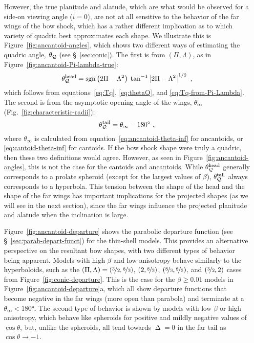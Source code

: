 \documentclass[useAMS, usenatbib, a4paper]{mnras}
\DeclareMathOperator{\sgn}{sgn}
\DeclareMathOperator{\Depart}{\Delta}
\providecommand{\Abs}[1]{\left\lvert#1\right\rvert}
\begin{document}
However, the true planitude and alatude, which are what would be
observed for a side-on viewing angle (\(i = 0\)), are not at all
sensitive to the behavior of the far wings of the bow shock, which has
a rather different implication as to which variety of quadric best
approximates each shape.  We illustrate this is
Figure~\ref{fig:ancantoid-angles}, which shows two different ways of
estimating the quadric angle, \(\theta_{\mathcal{Q}}\) (see \S~\ref{sec:conic}).
The first is from \((\Pi, \Lambda)\), as in
Figure~\ref{fig:ancantoid-Pi-lambda-true}:
\newcommand\head{^{\text{head}}}
\newcommand\tail{^{\text{tail}}}
\begin{equation}
  \label{eq:thetaQ-head}
  \theta_{\Q}\head =
  \sgn{\bigl(2 \Pi - \Lambda^2\bigr)} \;
  \tan^{-1} \Abs{2\Pi - \Lambda^2}^{1/2} \ ,
\end{equation}
which follows from equations~\eqref{eq:Tq}, \eqref{eq:thetaQ}, and
\eqref{eq:Tq-from-Pi-Lambda}.  The second is from the asymptotic
opening angle of the wings, \(\theta_\infty\) (Fig.~\ref{fig:characteristic-radii}):
\begin{equation}
  \label{eq:thetaQ-tail}
  \theta_{\Q}\tail = \theta_\infty - \ang{180} \ , 
\end{equation}
where \(\theta_\infty\) is calculated from
equation~\eqref{eq:ancantoid-theta-inf} for ancantoids, or
\eqref{eq:cantoid-theta-inf} for cantoids.  If the bow shock shape
were truly a quadric, then these two definitions would agree.
However, as seen in Figure~\ref{fig:ancantoid-angles}, this is not the
case for the cantoids and ancantoids.  While
\(\smash[b]{\theta_{\Q}\head}\) generally corresponds to a prolate spheroid
(except for the largest values of \(\beta\)),
\(\smash[b]{\theta_{\Q}\tail}\) always corresponds to a hyperbola.  This
tension between the shape of the head and the shape of the far wings
has important implications for the projected shapes (as we will see in
the next section), since the far wings influence the projected
planitude and alatude when the inclination is large.

Figure~\ref{fig:ancantoid-departure} shows the parabolic departure
function (see \S~\ref{sec:parab-depart-funct}) for the thin-shell
models. This provides an alternative perspective on the resultant bow
shapes, with two different types of behavior being apparent.  Models
with high \(\beta\) and low anisotropy behave similarly to the
hyperboloids, such as the
\((\Pi, \Lambda) = (\nicefrac32, \nicefrac83)\), \((2, \nicefrac83)\),
\((\nicefrac83, \nicefrac83)\), and \((\nicefrac32, 2)\) cases from
Figure~\ref{fig:conic-departure}.  This is the case for the
\(\beta \ge 0.01\) models in Figure~\ref{fig:ancantoid-departure}a, which
all show departure functions that become negative in the far wings
(more open than parabola) and terminate at a
\(\theta_\infty < \ang{180}\).  The second type of behavior is shown by models with
low \(\beta\) or high anisotropy, which behave like spheroids for positive
and mildly negative values of \(\cos \theta\), but, unlike the spheroids,
all tend towards \(\Depart = 0\) in the far tail as \(\cos\theta \to -1\).
\end{document}
